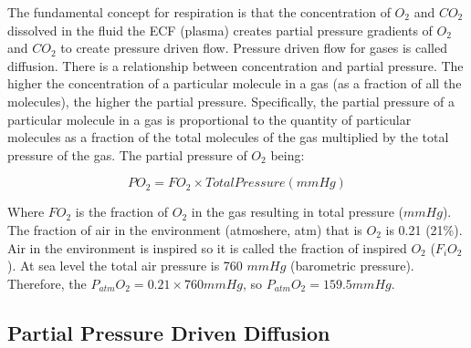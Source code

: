 The fundamental concept for respiration is that the concentration of $O_2$ and $CO_2$ dissolved in the fluid the ECF (plasma) creates partial pressure gradients of $O_2$ and $CO_2$ to create pressure driven flow. Pressure driven flow for gases is called diffusion. There is a relationship between concentration and partial pressure. The higher the concentration of a particular molecule in a gas (as a fraction of all the molecules), the higher the partial pressure.\footnotemark{} Specifically, the partial pressure of a particular molecule in a gas is proportional to the quantity of particular molecules as a fraction of the total molecules of the gas multiplied by the total pressure of the gas. The partial pressure of $O_2$ being:

\begin{equation}
    PO_2 = FO_2 \times Total Pressure (mmHg)
    \label{PO2}
\end{equation}

Where $FO_2$ is the fraction of $O_2$ in the gas resulting in total pressure ($mmHg$). The fraction of air in the environment (atmoshere, atm) that is $O_2$ is 0.21 (21\%). Air in the environment is inspired so it is called the fraction of inspired $O_2$ ($F_iO_2$). At sea level the total air pressure is 760 $mmHg$ (barometric pressure). Therefore, the $P_{atm}O_2 = 0.21 \times 760 mmHg$, so $P_{atm}O_2 = 159.5 mmHg$. 

\subsection{Partial Pressure Driven Diffusion}

